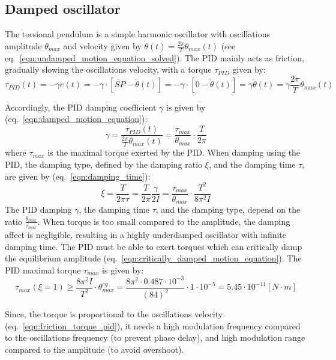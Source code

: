 \documentclass[\main/master.tex]{subfiles}
\begin{document}
\subsection{Damped oscillator}
The torsional pendulum is a simple harmonic oscillator with oscillations amplitude $\theta_{max}$ and velocity given by $\dot{\theta}(t) =\frac{2\pi}{T} \theta_{max}( t)$ (see eq.~\ref{eqn:undamped_motion_equation_solved}). The PID mainly acts as friction, gradually slowing the oscillations velocity, with a torque $\tau_{PID}$ given by:
\begin{equation}
\tau_{PID}(t) = -\gamma\dot{e}(t) =  -\gamma\cdot [\dot{SP} -\dot{\theta}(t)] =-\gamma\cdot [0-\dot{\theta}(t)]  =  \gamma\dot{\theta}(t) =  \gamma\frac{2\pi}{T} \theta_{max}( t) 
\label{eqn:friction_torque_pid}
\end{equation}
\par\noindent
Accordingly, the PID damping coefficient $\gamma$ is given by (eq.~\ref{eqn:damped_motion_equation}):
\begin{equation}
\gamma  =  \frac{\tau_{PID}(t)}{\frac{2\pi}{T} \theta_{max}( t) } =\frac{\tau_{max}}{\theta_{max}}\cdot \frac{ T}{2\pi}          \label{eqn:pid damping coefficient}
\end{equation}
where $\tau_{max}$ is the maximal torque exerted by the PID. When damping using the PID, the damping type, defined by the damping ratio $\xi$, and the damping time $\tau$, are given by (eq.~\ref{eqn:damping_time}):
\begin{equation}
\xi = \frac{T}{2 \pi \tau } =  \frac{T}{2 \pi  }\frac{\gamma}{2I}  = \frac{ \tau_{max}}{\theta_{max}} \cdot \frac{T^2}{8\pi^2 I}  \label{eqn:damping_time_pid}
\end{equation}
The PID damping $\gamma$, the damping time $\tau$, and the damping type, depend on the ratio $\frac{\theta_{max}}{\tau_{max}}$. When torque is too small compared to the amplitude, the damping affect is negligible, resulting in a highly underdamped oscillator with infinite damping time. The PID must be able to exert torques which can critically damp the equilibrium amplitude (eq.~\ref{eqn:critically_damped_motion_equation}). The PID maximal torque $\tau_{max} $ is given by:
\begin{equation}
\tau_{max} (\xi = 1)\geq\frac{ 8 \pi^2 I }{T^2}\cdot\theta_{max}^{eq} = \frac{  8 \pi^2 \cdot 0.487\cdot10^{-3} }{(84)^2}\cdot 1\cdot10^{-5} = 5.45\cdot10^{-11}[N\cdot m]
\label{eqn:damping_torque_pid}
\end{equation}
\par\noindent
Since, the torque is proportional to the oscillations velocity (eq.~\ref{eqn:friction_torque_pid}), it needs a high modulation frequency compared to the oscillations frequency (to prevent phase delay), and high modulation range compared to the amplitude (to avoid overshoot). 
\end{document}
